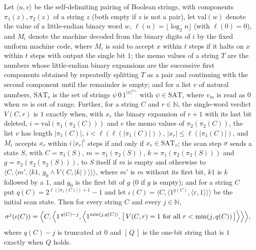\begin{theorem}
\label{Complexity.ladner_test_orbit}
\leanok
{}
Let $\langle u,v\rangle$ be the self-delimiting pairing of Boolean strings, with components $\pi_1(z),\pi_2(z)$ of a string $z$ (both empty if $z$ is not a pair), let $\mathrm{val}(w)$ denote the value of a little-endian binary word $w$, $\ell(n)=\lfloor\log_2 n\rfloor$ (with $\ell(0)=0$), and $M_i$ denote the machine decoded from the binary digits of $i$ by the fixed uniform machine code, where $M_i$ is said to accept $x$ within $t$ steps if it halts on $x$ within $t$ steps with output the single bit $1$; the memo values of a string $T$ are the numbers whose little-endian binary expansions are the successive first components obtained by repeatedly splitting $T$ as a pair and continuing with the second component until the remainder is empty; and for a list $v$ of natural numbers, $\mathrm{SAT}_v$ is the set of strings $\psi\,0\,1^{|\psi|^{v_{|\psi|}}}$ with $\psi\in\mathrm{SAT}$, where $v_m$ is read as $0$ when $m$ is out of range. Further, for a string $C$ and $r\in\mathbb N$, the single-word verdict $V(C,r)$ is $1$ exactly when, with $x_r$ the binary expansion of $r+1$ with its last bit deleted, $i=\mathrm{val}(\pi_1(\pi_2(C)))$ and $v$ the memo values of $\pi_2(\pi_2(C))$, the list $v$ has length $|\pi_1(C)|$, $i<\ell(\ell(|\pi_1(C)|))$, $|x_r|\le\ell(|\pi_1(C)|)$, and $M_i$ accepts $x_r$ within $i\,|x_r|^i$ steps if and only if $x_r\in\mathrm{SAT}_v$; the scan step $\sigma$ sends a state $S$, with $C=\pi_1(S)$, $m=\pi_1(\pi_2(S))$, $k=\pi_1(\pi_2(\pi_2(S)))$ and $g=\pi_2(\pi_2(\pi_2(S)))$, to $S$ itself if $m$ is empty and otherwise to $\langle C,\langle m',\langle k1,\,g_0\wedge V(C,|k|)\rangle\rangle\rangle$, where $m'$ is $m$ without its first bit, $k1$ is $k$ followed by a $1$, and $g_0$ is the first bit of $g$ ($0$ if $g$ is empty); and for a string $C$ put $q(C)=2^{\ell(|\pi_1(C)|)+1}-1$ and let $\iota(C)=\langle C,\langle 1^{q(C)},\langle\varepsilon,1\rangle\rangle\rangle$ be the initial scan state.
Then for every string $C$ and every $j\in\mathbb N$,
\[
  \sigma^{j}(\iota(C))=\Bigl\langle C,\Bigl\langle 1^{\,q(C)-j},\Bigl\langle 1^{\min(j,q(C))},
  \bigl[\,V(C,r)=1\text{ for all }r<\min(j,q(C))\,\bigr]\Bigr\rangle\Bigr\rangle\Bigr\rangle,
\]
where $q(C)-j$ is truncated at $0$ and $[\,Q\,]$ is the one-bit string that is $1$ exactly when
$Q$ holds.
\end{theorem}

